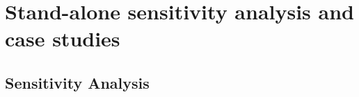 \documentclass[gmd, manuscript]{copernicus}
\begin{document}
\begin{table}[btp]
\begin{tabular}{l c c l}
\hline\hline
\end{tabular}
\label{table:reaction_parameters}
\end{table}


\section{Stand-alone sensitivity analysis and case studies}


\subsection{Sensitivity Analysis}\label{subsec:SA}
\end{document}
